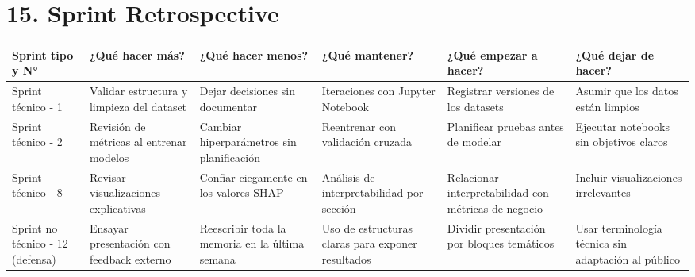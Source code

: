 \documentclass[
11pt, %
]{charter}
\begin{document}
\section{15. Sprint Retrospective}    
\label{sec:sprint_retro}

  \begin{table}[htpb]
    \renewcommand{\arraystretch}{1.4}
    \begin{tabular}{|>{\raggedright\arraybackslash}p{1.8cm}|
                    >{\raggedright\arraybackslash}p{2.3cm}|
                    >{\raggedright\arraybackslash}p{2.3cm}|
                    >{\raggedright\arraybackslash}p{2.3cm}|
                    >{\raggedright\arraybackslash}p{2.3cm}|
                    >{\raggedright\arraybackslash}p{2.3cm}|}
    \hline
    \rowcolor[HTML]{CCCCCC} 
    \textbf{Sprint tipo y N°} & \textbf{¿Qué hacer más?} & \textbf{¿Qué hacer menos?} & \textbf{¿Qué mantener?} & \textbf{¿Qué empezar a hacer?} & \textbf{¿Qué dejar de hacer?} \\
    \hline
    Sprint técnico - 1 & Validar estructura y limpieza del dataset & Dejar decisiones sin documentar & Iteraciones con Jupyter Notebook & Registrar versiones de los datasets & Asumir que los datos están limpios \\
    \hline
    Sprint técnico - 2 & Revisión de métricas al entrenar modelos & Cambiar hiperparámetros sin planificación & Reentrenar con validación cruzada & Planificar pruebas antes de modelar & Ejecutar notebooks sin objetivos claros \\
    \hline
    Sprint técnico - 8 & Revisar visualizaciones explicativas & Confiar ciegamente en los valores SHAP & Análisis de interpretabilidad por sección & Relacionar interpretabilidad con métricas de negocio & Incluir visualizaciones irrelevantes \\
    \hline
    Sprint no técnico - 12 (defensa) & Ensayar presentación con feedback externo & Reescribir toda la memoria en la última semana & Uso de estructuras claras para exponer resultados & Dividir presentación por bloques temáticos & Usar terminología técnica sin adaptación al público \\
    \hline
    \end{tabular}
    \end{table}
\end{document}

